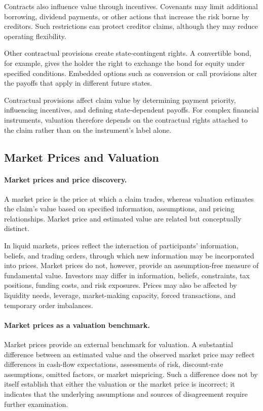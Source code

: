Contracts also influence value through incentives. Covenants may limit additional borrowing, dividend payments, or other actions that increase the risk borne by creditors. Such restrictions can protect creditor claims, although they may reduce operating flexibility.

Other contractual provisions create state-contingent rights. A convertible bond, for example, gives the holder the right to exchange the bond for equity under specified conditions. Embedded options such as conversion or call provisions alter the payoffs that apply in different future states.

Contractual provisions affect claim value by determining payment priority, influencing incentives, and defining state-dependent payoffs. For complex financial instruments, valuation therefore depends on the contractual rights attached to the claim rather than on the instrument's label alone.

\subsection{Market Prices and Valuation}

\paragraph{Market prices and price discovery.}
A market price is the price at which a claim trades, whereas valuation estimates the claim's value based on specified information, assumptions, and pricing relationships. Market price and estimated value are related but conceptually distinct.

In liquid markets, prices reflect the interaction of participants' information, beliefs, and trading orders, through which new information may be incorporated into prices. Market prices do not, however, provide an assumption-free measure of fundamental value. Investors may differ in information, beliefs, constraints, tax positions, funding costs, and risk exposures. Prices may also be affected by liquidity needs, leverage, market-making capacity, forced transactions, and temporary order imbalances.

\paragraph{Market prices as a valuation benchmark.}
Market prices provide an external benchmark for valuation. A substantial difference between an estimated value and the observed market price may reflect differences in cash-flow expectations, assessments of risk, discount-rate assumptions, omitted factors, or market mispricing. Such a difference does not by itself establish that either the valuation or the market price is incorrect; it indicates that the underlying assumptions and sources of disagreement require further examination.

